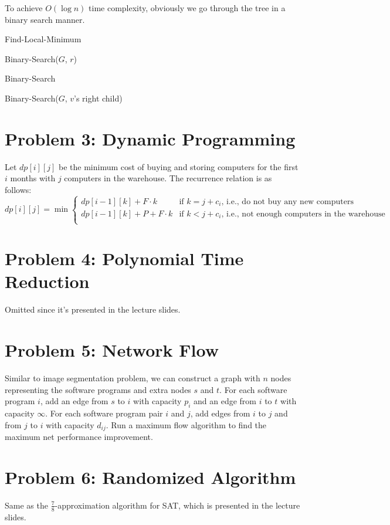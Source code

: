 \documentclass[a4paper,12pt]{article}
\begin{document}
To achieve $O(\log n)$ time complexity, obviously we go through the tree in a binary search manner.

\begin{algorithm}[H]
  \caption{Find-Local-Minimum}
  Binary-Search($G$, $r$)\;
\end{algorithm}

\begin{algorithm}[H]
  \caption{Binary-Search}
  \Return Binary-Search($G$, $v$'s right child)\;
\end{algorithm}

\section*{Problem 3: Dynamic Programming}

Let $dp[i][j]$ be the minimum cost of buying and storing computers for the first $i$ months with $j$ computers in the warehouse. The recurrence relation is as follows:
\begin{equation*}
  dp[i][j] = \min
  \begin{cases}
    dp[i-1][k] + F \cdot k & \text{if } k = j + c_i \text{, i.e., do not buy any new computers} \\
    dp[i-1][k] + P + F \cdot k & \text{if } k < j + c_i \text{, i.e., not enough computers in the warehouse} \\
  \end{cases}
\end{equation*}

\section*{Problem 4: Polynomial Time Reduction}

Omitted since it's presented in the lecture slides.

\section*{Problem 5: Network Flow}

Similar to image segmentation problem, we can construct a graph with $n$ nodes representing the software programs and extra nodes $s$ and $t$. For each software program $i$, add an edge from $s$ to $i$ with capacity $p_i$ and an edge from $i$ to $t$ with capacity $\infty$. For each software program pair $i$ and $j$, add edges from $i$ to $j$ and from $j$ to $i$ with capacity $d_{ij}$. Run a maximum flow algorithm to find the maximum net performance improvement.

\section*{Problem 6: Randomized Algorithm}

Same as the $\frac{7}{8}$-approximation algorithm for SAT, which is presented in the lecture slides.
\end{document}
